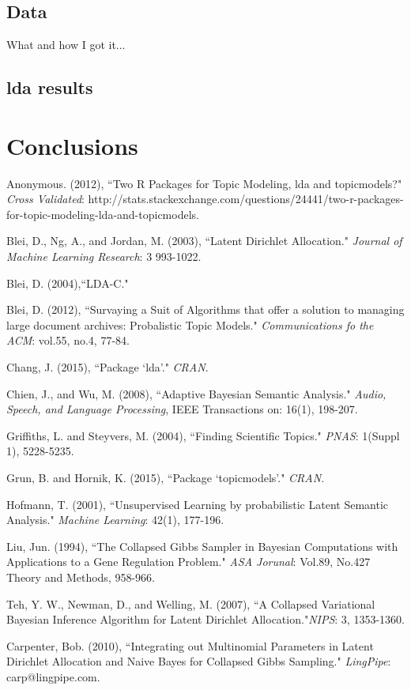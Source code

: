 \documentclass[3p,times]{elsarticle}
\begin{document}
\subsection{Data}
What and how I got it...
\subsection{lda results}

\section{Conclusions}




\begin{thebibliography}{4}
	Anonymous. (2012),
	``Two R Packages for Topic Modeling, lda and topicmodels?" \textit{Cross Validated}: http://stats.stackexchange.com/questions/24441/two-r-packages-for-topic-modeling-lda-and-topicmodels.
	
	Blei, D., Ng, A., and Jordan, M.  (2003),
	``Latent Dirichlet Allocation."
	\textit{Journal of Machine Learning Research}: 3 993-1022.
	
	Blei, D. (2004),``LDA-C."
	
	Blei, D.  (2012),
	``Survaying a Suit of Algorithms that offer a solution to managing large document archives:          Probalistic Topic Models." \textit{Communications fo the ACM}: vol.55, no.4, 77-84.
	
	Chang, J.  (2015),
	``Package `lda'."
	\textit{CRAN}.
	
	Chien, J., and Wu, M.  (2008),
	``Adaptive Bayesian Semantic Analysis."
	\textit{Audio, Speech, and Language Processing}, IEEE Transactions on: 16(1), 198-207.
	
	Griffiths, L. and Steyvers, M.  (2004),
	``Finding Scientific Topics."
	\textit{PNAS}: 1(Suppl 1), 5228-5235.
	
	Grun, B. and Hornik, K.  (2015),
	``Package `topicmodels'."
	\textit{CRAN}.
	
	Hofmann, T.  (2001),
	``Unsupervised Learning by probabilistic Latent Semantic Analysis."
	\textit{Machine Learning}: 42(1), 177-196.
	
	Liu, Jun.  (1994),
	``The Collapsed Gibbs Sampler in Bayesian Computations with Applications to a Gene Regulation Problem." \textit{ASA Jorunal}: Vol.89, No.427 Theory and Methods, 958-966.
	
	Teh, Y. W., Newman, D., and Welling, M.  (2007),
	``A Collapsed Variational Bayesian Inference Algorithm for Latent Dirichlet 
	Allocation."\textit{NIPS}: 3, 1353-1360.
	
	Carpenter, Bob. (2010),
	``Integrating out Multinomial Parameters in Latent Dirichlet Allocation and Naive       Bayes for Collapsed Gibbs Sampling."
	\textit{LingPipe}: carp@lingpipe.com.
	
\end{thebibliography}
\end{document}
